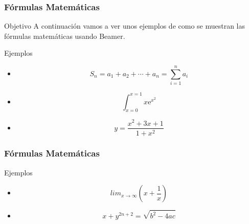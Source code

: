\documentclass{beamer}
\begin{document}
\begin{frame}

\frametitle{Fórmulas Matemáticas}

\begin{block}{Objetivo}
 A continuación vamos a ver unos ejemplos de como se muestran las fórmulas matemáticas usando Beamer.
 
\end{block}

\begin{block}{Ejemplos}

\begin{itemize}
  \item
  \begin{scriptsize}
  \[ S_n=a_1 + a_2 + \cdots + a_n = \sum_{i=1}^n a_i \]
  \end{scriptsize}
  \pause

  \item
  \begin{scriptsize}
  \[ \int_{x=0}^{x=1} x\text{e}^{x^2} \]
  \end{scriptsize}
  \pause

  \item
  \begin{scriptsize}
  \[ y=\frac{x^2 + 3x + 1}{1 + x^2} \]
  \end{scriptsize}
  
\end{itemize}

\end{block}

\end{frame}
 
 \begin{frame}

\frametitle{Fórmulas Matemáticas}

\begin{block}{Ejemplos}

\begin{itemize}

  \item
  \begin{scriptsize}
  \[ lim_{x\to\infty} \left(x + \frac{1}{x} \right) \]
  \end{scriptsize}
  \pause
  
  \item
  \begin{scriptsize}
  \[ x + y^{2n + 2} = \sqrt{b^2 - 4ac} \]
  \end{scriptsize}

  
\end{itemize}

\end{block}

\end{frame}
\end{document}
